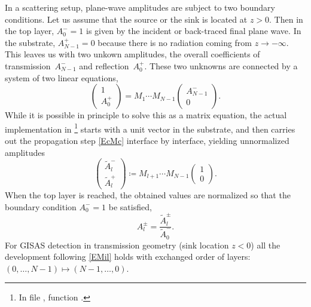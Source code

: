 In a scattering setup,
plane-wave amplitudes are subject to two boundary conditions.
Let us assume that the source or the sink is located at $z>0$.
Then in the top layer, $A^-_{0}=1$ is given by the
incident or back-traced final plane wave.
In the substrate, $A^+_{N-1}=0$ because there is no radiation
coming from $z\to-\infty$.
This leaves us with two unkown amplitudes,
the overall coefficients of transmission~$A^-_{N-1}$ and reflection~$A^+_0$.
These two unknowns are connected by a system of two linear equations,
\begin{equation}\label{E1Ap}
  \left( \begin{array}{c}1\\ A^+_0\end{array} \right)
  = M_1 \cdots M_{N-1} \left( \begin{array}{c}A^-_{N-1}\\0\end{array} \right).
\end{equation}
While it is possible in principle
to solve this as a matrix equation,
the actual implementation in \BornAgain\footnote
{In file , function .}
starts with a unit vector in the substrate,
and then carries out the propagation step \cref{EcMc}
interface by interface,
yielding unnormalized amplitudes
\begin{equation}\label{EAtildel}
  \left( \begin{array}{c}\tilde A^-_l\\ \tilde A^+_l\end{array} \right)
  \coloneqq M_{l+1}\cdots M_{N-1} \left( \begin{array}{c}1\\0\end{array} \right).
\end{equation}
When the top layer is reached,
the obtained values are normalized
so that the boundary condition $A^-_{0}=1$ be satisfied,
\begin{equation}\label{EApml}
  A^\pm_l = \frac{\tilde A^\pm_l}{\tilde A^-_0}.
\end{equation}
For GISAS detection in transmission geometry
%
%
(sink location $z<0$) all the development
following \cref{EMil} holds with exchanged order of layers:
$(0,\ldots, N-1) \mapsto (N-1,\ldots,0)$.


